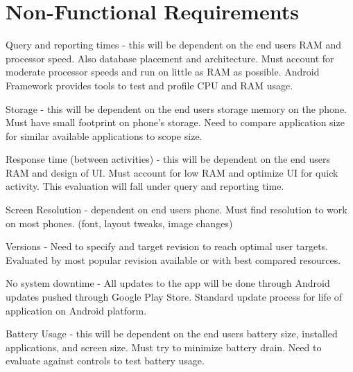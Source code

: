 \section{Non-Functional Requirements}
Query and reporting times - this will be dependent on the end users RAM and processor speed. Also database placement and architecture. Must account for moderate processor speeds and run on little as RAM as possible. Android Framework provides tools to test and profile CPU and RAM usage. 

Storage - this will be dependent on the end users storage memory on the phone. Must have small footprint on phone’s storage. Need to compare application size for similar available applications to scope size. 

Response time (between activities) - this will be dependent on the end users RAM and design of UI.  Must account for low RAM and optimize UI for quick activity. This evaluation will fall under query and reporting time. 

Screen Resolution - dependent on end users phone. Must find resolution to work on most phones. (font, layout tweaks, image changes)

Versions - Need to specify and target revision to reach optimal user targets. Evaluated by most popular revision available or with best compared resources. 

No system downtime - All updates to the app will be done through Android updates pushed through Google Play Store. Standard update process for life of application on Android platform. 

Battery Usage - this will be dependent on the end users battery size, installed applications, and screen size. Must try to minimize battery drain. Need to evaluate against controls to test battery usage. 
